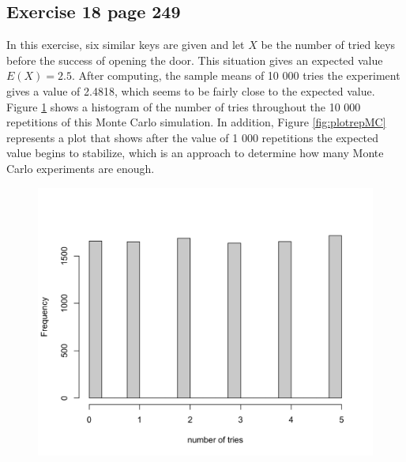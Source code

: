 \documentclass[10pt,leter,openany]{article}
\begin{document}
\subsection{Exercise 18 page 249}

In this exercise, six similar keys are given and let $ X $ be the number of tried keys before the success of opening the door. This situation gives an expected value $ E(X) = 2.5 $.  After computing, the sample means of 10 000 tries the experiment gives a value of 2.4818, which seems to be fairly close to the expected value. Figure \ref{fig:hist1} shows a histogram of the number of tries throughout the 10 000 repetitions of this Monte Carlo simulation. In addition, Figure \ref{fig:plotrepMC} represents a plot that shows after the value of 1 000 repetitions the expected value begins to stabilize, which is an approach to determine how many Monte Carlo experiments are enough.

\begin{figure}
	\begin{center}
		\includegraphics[scale=0.15]{img/hist_18_249}
		\label{fig:hist1}
	\end{center}
\end{figure}
\end{document}
